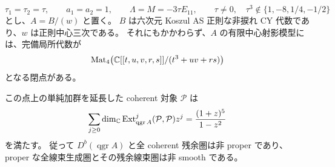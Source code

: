 \begin{theorem}
\label{ifd:thm:residual-a2}
\[
 \tau_1=\tau_2=\tau,\qquad a_1=a_2=1,\qquad
 \Lambda=M=-3\tau E_{11},\qquad
 \tau\ne0,\quad \tau^3\notin\{1,-8,1/4,-1/2\}
\]
とし、$A=B/(w)$ と置く。
$B$ は六次元 Koszul AS 正則な非捩れ CY 代数であり、$w$ は正則中心三次である。
それにもかかわらず、$A$ の有限中心射影模型には、完備局所代数が
\begin{equation}\label{ifd:eq:completed-matrix-a2}
 \operatorname{Mat}_{4}\!\left(
       \mathbb C[[t,u,v,r,s]]/(t^3+uv+rs)\right)
\end{equation}
となる閉点がある。

この点上の単純加群を延長した coherent 対象 $\mathcal P$ は
\begin{equation}\label{ifd:eq:point-poincare}
 \sum_{j\ge0}\dim_\mathbb C
       \operatorname{Ext}_{\operatorname{qgr}A}^j
             (\mathcal P,\mathcal P)z^j
       =\frac{(1+z)^5}{1-z^2}
\end{equation}
を満たす。
従って $D^b(\operatorname{qgr}A)$ と全 coherent 残余圏は非 proper であり、
proper な全線束生成圏とその残余線束圏は非 smooth である。
\end{theorem}

